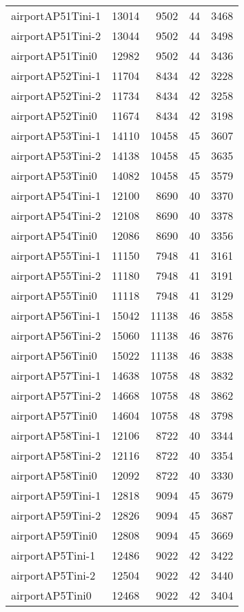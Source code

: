 \begin{longtable}{lrrrr}
airportAP51Tini-1 & 13014 & 9502 & 44 & 3468 \\
airportAP51Tini-2 & 13044 & 9502 & 44 & 3498 \\
airportAP51Tini0 & 12982 & 9502 & 44 & 3436 \\
airportAP52Tini-1 & 11704 & 8434 & 42 & 3228 \\
airportAP52Tini-2 & 11734 & 8434 & 42 & 3258 \\
airportAP52Tini0 & 11674 & 8434 & 42 & 3198 \\
airportAP53Tini-1 & 14110 & 10458 & 45 & 3607 \\
airportAP53Tini-2 & 14138 & 10458 & 45 & 3635 \\
airportAP53Tini0 & 14082 & 10458 & 45 & 3579 \\
airportAP54Tini-1 & 12100 & 8690 & 40 & 3370 \\
airportAP54Tini-2 & 12108 & 8690 & 40 & 3378 \\
airportAP54Tini0 & 12086 & 8690 & 40 & 3356 \\
airportAP55Tini-1 & 11150 & 7948 & 41 & 3161 \\
airportAP55Tini-2 & 11180 & 7948 & 41 & 3191 \\
airportAP55Tini0 & 11118 & 7948 & 41 & 3129 \\
airportAP56Tini-1 & 15042 & 11138 & 46 & 3858 \\
airportAP56Tini-2 & 15060 & 11138 & 46 & 3876 \\
airportAP56Tini0 & 15022 & 11138 & 46 & 3838 \\
airportAP57Tini-1 & 14638 & 10758 & 48 & 3832 \\
airportAP57Tini-2 & 14668 & 10758 & 48 & 3862 \\
airportAP57Tini0 & 14604 & 10758 & 48 & 3798 \\
airportAP58Tini-1 & 12106 & 8722 & 40 & 3344 \\
airportAP58Tini-2 & 12116 & 8722 & 40 & 3354 \\
airportAP58Tini0 & 12092 & 8722 & 40 & 3330 \\
airportAP59Tini-1 & 12818 & 9094 & 45 & 3679 \\
airportAP59Tini-2 & 12826 & 9094 & 45 & 3687 \\
airportAP59Tini0 & 12808 & 9094 & 45 & 3669 \\
airportAP5Tini-1 & 12486 & 9022 & 42 & 3422 \\
airportAP5Tini-2 & 12504 & 9022 & 42 & 3440 \\
airportAP5Tini0 & 12468 & 9022 & 42 & 3404 \\

\end{longtable}
